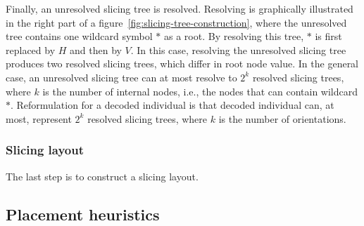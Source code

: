 Finally, an unresolved slicing tree is resolved.
Resolving is graphically illustrated in the right part of a figure~\ref{fig:slicing-tree-construction},
where the unresolved tree contains one wildcard symbol $*$ as a root.
By resolving this tree, $*$ is first replaced by $H$ and then by $V$.
In this case, resolving the unresolved slicing tree produces two resolved slicing trees,
which differ in root node value.
In the general case, an unresolved slicing tree can at most resolve to $2^k$ resolved slicing trees,
where $k$ is the number of internal nodes, i.e., the nodes that can contain wildcard $*$.
Reformulation for a decoded individual is that decoded individual can, at most, represent
$2^k$ resolved slicing trees, where $k$ is the number of orientations.



\subsubsection*{Slicing layout}

The last step is to construct a slicing layout.



\subsection{Placement heuristics}\label{subsec:placement-heuristics}
